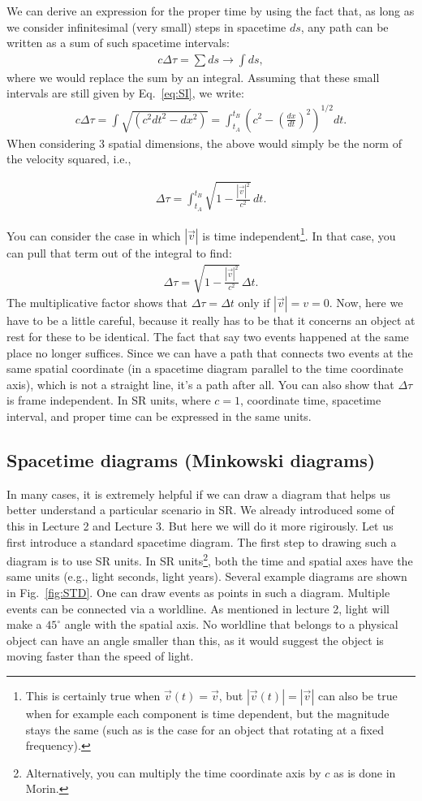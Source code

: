 \documentclass[12pt]{article}
\newcommand{\be}{\begin{eqnarray}}
\newcommand{\ee}{\end{eqnarray}}
\begin{document}
We can derive an expression for the proper time by using the fact that, as long as we consider infinitesimal (very small) steps in spacetime $ds$, any path can be written as a sum of such spacetime intervals:
\be
c\Delta \tau = \sum ds\rightarrow \int ds,
\ee
where we would replace the sum by an integral. Assuming that these small intervals are still given by Eq.~\eqref{eq:SI}, we write:
\be
c\Delta \tau = \int \sqrt{(c^2 dt^2 - dx^2)} = \int_{t_A}^{t_B} \left(c^2 - \left(\frac{dx}{dt}\right)^2\right)^{1/2} dt.
\ee
When considering 3 spatial dimensions, the above would simply be the norm of the velocity squared, i.e.,
\begin{tcolorbox}[colback=blue!5!white]
\vspace{-1.3em}
\be
\Delta \tau = \int_{t_A}^{t_B} \sqrt{1-\frac{|\vec{v}|^2}{c^2}}\,dt.
\ee
\end{tcolorbox}
You can consider the case in which $|\vec{v}|$ is time independent\footnote{This is certainly true when $\vec{v}(t) = \vec{v}$, but $|\vec{v}(t)| = |\vec{v}|$ can also be true when for example each component is time dependent, but the magnitude stays the same (such as is the case for an object that rotating at a fixed frequency).}. In that case, you can pull that term out of the integral to find:
\be
\Delta \tau  =\sqrt{1-\frac{|\vec{v}|^2}{c^2}}\, \Delta t.
\ee
The multiplicative factor shows that $\Delta \tau = \Delta t$ only if $|\vec{v}| = v = 0$. Now, here we have to be a little careful, because it really has to be that it concerns an object at rest for these to be identical. The fact that say two events happened at the same place no longer suffices. Since we can have a path that connects two events at the same spatial coordinate (in a spacetime diagram parallel to the time coordinate axis), which is not a straight line, it's a path after all. You can also show that $\Delta \tau$ is frame independent. In SR units, where $c=1$, coordinate time, spacetime interval, and proper time can be expressed in the same units.

\subsection{Spacetime diagrams (Minkowski diagrams)}
In many cases, it is extremely helpful if we can draw a diagram that helps us better understand a particular scenario in SR. We already introduced some of this in Lecture 2 and Lecture 3. But here we will do it more rigirously. Let us first introduce a standard spacetime diagram. The first step to drawing such a diagram is to use SR units. In SR units\footnote{Alternatively, you can multiply the time coordinate axis by $c$ as is done in Morin.}, both the time and spatial axes have the same units (e.g., light seconds, light years). Several example diagrams are shown in Fig.~\ref{fig:STD}. One can draw events as points in such a diagram. Multiple events can be connected via a worldline. As mentioned in lecture 2, light will make a $45^\circ$ angle with the spatial axis. No worldline that belongs to a physical object can have an angle smaller than this, as it would suggest the object is moving faster than the speed of light.
\end{document}
